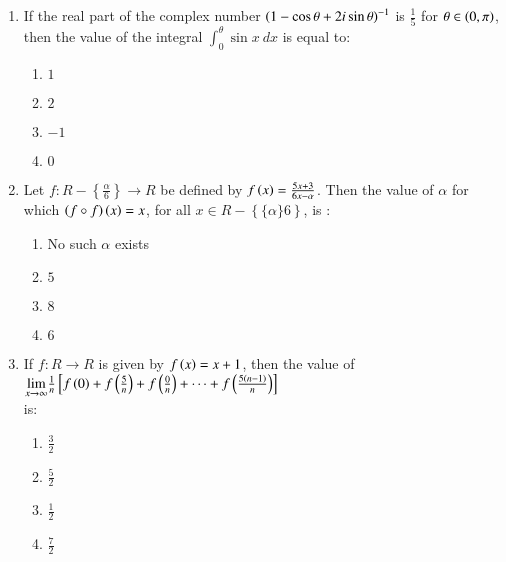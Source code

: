 \documentclass[journal]{IEEEtran}
\begin{document}
\begin{enumerate}
    \item If the real part of the complex number $\left(1-\cos\theta + 2i\sin\theta\right)^{-1}$ is $\frac{1}{5}$ for $\theta\in\left(0,\pi\right)$, then the value of the integral $\int_0^\theta\sin x\ dx$ is equal to:

        \begin{multicols}{4}
            \begin{enumerate}
                \item $1$
                \item $2$
                \item $-1$
                \item $0$
            \end{enumerate}
        \end{multicols}
		
    \item Let $f:R-\left\{\frac{\alpha}{6}\right\}\rightarrow R$ be defined by $f\left(x\right)=\frac{5x+3}{6x-\alpha}$. Then the value of $\alpha$ for which $\left(f\circ f\right)\left(x\right)=x$, for all $x\in R-\left\{\{\alpha\}{6}\right\}$, is :

        \begin{multicols}{4}
            \begin{enumerate}
                \item No such $\alpha$ exists
                \item $5$
                \item $8$
                \item $6$
            \end{enumerate}
        \end{multicols}
	
    \item If $f:R\rightarrow R$ is given by $f\left(x\right)=x+1$, then the value of\\
    $\underset{x\to\infty}{\lim}\frac{1}{n}\left[f\left(0\right)+f\left(\frac{5}{n}\right)+f\left(\frac{0}{n}\right)+\cdots+f\left(\frac{5\left(n-1\right)}{n}\right)\right]$\\ is:

        \begin{multicols}{4}
            \begin{enumerate}
                \item $\frac{3}{2}$
                \item $\frac{5}{2}$
                \item $\frac{1}{2}$
                \item $\frac{7}{2}$
            \end{enumerate}
        \end{multicols}


\end{enumerate}
\end{document}
